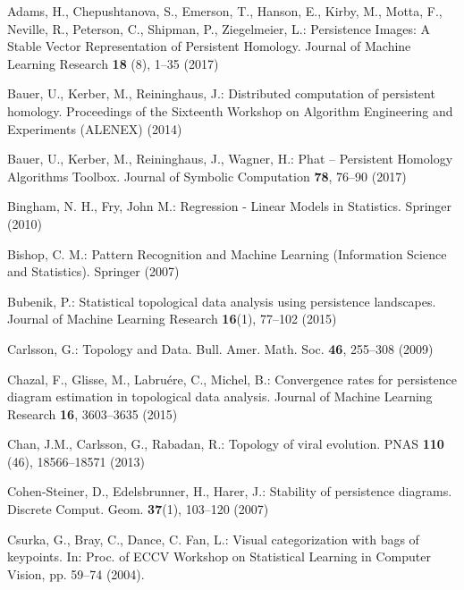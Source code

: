 \documentclass[smallextended]{svjour3}
\begin{document}
\begin{thebibliography}{99}
  Adams, H., Chepushtanova, S., Emerson,  T.,
  Hanson, E., Kirby, M., Motta, F.,
  Neville, R., Peterson, C., Shipman, P., Ziegelmeier, L.:
  Persistence Images: A Stable Vector Representation of Persistent Homology.
  Journal of Machine Learning Research \textbf{18} (8), 1--35 (2017)

  Bauer, U., Kerber, M., Reininghaus, J.:
  Distributed computation of persistent homology.
  Proceedings of the Sixteenth Workshop on Algorithm Engineering and Experiments (ALENEX) (2014)

  Bauer, U., Kerber, M., Reininghaus, J., Wagner, H.:
  Phat -- Persistent Homology Algorithms Toolbox.
  Journal of Symbolic Computation \textbf{78}, 76--90 (2017)

  Bingham, N. H., Fry, John M.:
  Regression - Linear Models in Statistics.
  Springer (2010)

  Bishop, C. M.:
  Pattern Recognition and Machine Learning (Information Science and Statistics).
  Springer (2007)
 
  Bubenik, P.: Statistical topological data analysis using persistence landscapes. Journal of Machine Learning Research \textbf{16}(1), 77--102 (2015)

  Carlsson, G.:
  Topology and Data. 
  Bull. Amer. Math. Soc. \textbf{46}, 255--308 (2009)

  Chazal, F., Glisse, M., Labru{\'e}re, C., Michel, B.: Convergence rates for persistence diagram estimation in topological data analysis. Journal of Machine Learning Research \textbf{16}, 3603--3635 (2015)

  Chan, J.M., Carlsson, G., Rabadan, R.:
  Topology of viral evolution.
  PNAS \textbf{110} (46), 18566--18571 (2013)

  
  Cohen-Steiner, D., Edelsbrunner, H., Harer, J.: Stability of persistence diagrams. Discrete Comput. Geom. \textbf{37}(1), 103--120 (2007)

  Csurka, G., Bray, C., Dance, C. Fan, L.:
  Visual categorization with bags of keypoints.
  In: Proc. of ECCV Workshop on Statistical
  Learning in Computer Vision, pp. 59--74 (2004).


\end{thebibliography}
\end{document}
